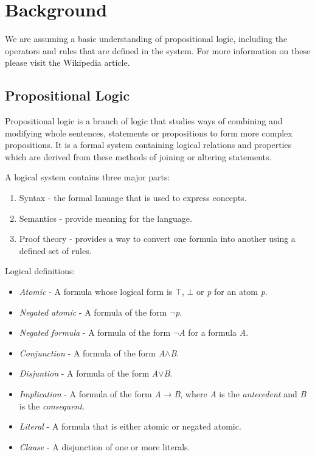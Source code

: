 \documentclass{report}
\begin{document}
\chapter{Background}

We are assuming a basic understanding of propositional logic, including the operators and rules that are defined in the system. For more information on these please visit the Wikipedia article\cite{propositionalwiki}.


\section{Propositional Logic}

Propositional logic is a branch of logic that studies ways of combining and modifying whole sentences, statements or propositions to form more complex propositions. It is a formal system containing logical relations and properties which are derived from these methods of joining or altering statements.

A logical system contains three major parts:

\begin{enumerate}
\item Syntax - the formal lanuage that is used to express concepts.
\item Semantics - provide meaning for the language.
\item Proof theory - provides a way to convert one formula into another using a defined set of rules.
\end{enumerate}

Logical definitions:

\begin{itemize}
\item \emph{Atomic} - A formula whose logical form is $\top$, $\bot$ or \textit{p} for an atom \textit{p}.
\item \emph{Negated atomic} - A formula of the form $\neg$\textit{p}.
\item \emph{Negated formula} - A formula of the form $\neg$\textit{A} for a formula \textit{A}.
\item \emph{Conjunction} - A formula of the form \textit{A}$\land$\textit{B}.
\item \emph{Disjuntion} - A formula of the form \textit{A}$\lor$\textit{B}.
\item \emph{Implication} - A formula of the form \textit{A}$\to$\textit{B}, where \textit{A} is the \emph{antecedent} and \textit{B} is the \emph{consequent}.
\item \emph{Literal} - A formula that is either atomic or negated atomic.
\item \emph{Clause} - A disjunction of one or more literals.
\end{itemize}
\end{document}
